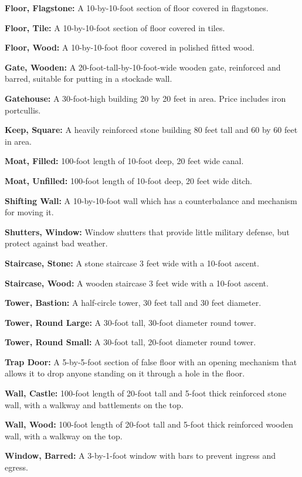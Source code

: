 \begin{multicols*}{2}
\textbf{Floor, Flagstone:} A 10-by-10-foot section of floor covered in flagstones.

\textbf{Floor, Tile:} A 10-by-10-foot section of floor covered in tiles.

\textbf{Floor, Wood:} A 10-by-10-foot floor covered in polished fitted wood.

\textbf{Gate, Wooden:} A 20-foot-tall-by-10-foot-wide wooden gate, reinforced and barred, suitable for putting in a stockade wall.

\textbf{Gatehouse:} A 30-foot-high building 20 by 20 feet in area. Price includes iron portcullis.

\textbf{Keep, Square:} A heavily reinforced stone building 80 feet tall and 60 by 60 feet in area.

\textbf{Moat, Filled:} 100-foot length of 10-foot deep, 20 feet wide canal.

\textbf{Moat, Unfilled:} 100-foot length of 10-foot deep, 20 feet wide ditch.

\textbf{Shifting Wall:} A 10-by-10-foot wall which has a counterbalance and mechanism for moving it.

\textbf{Shutters, Window:} Window shutters that provide little military defense, but protect against bad weather.

\textbf{Staircase, Stone:} A stone staircase 3 feet wide with a 10-foot ascent.

\textbf{Staircase, Wood:} A wooden staircase 3 feet wide with a 10-foot ascent.

\textbf{Tower, Bastion:} A half-circle tower, 30 feet tall and 30 feet diameter.

\textbf{Tower, Round Large:} A 30-foot tall, 30-foot diameter round tower.

\textbf{Tower, Round Small:} A 30-foot tall, 20-foot diameter round tower.

\textbf{Trap Door:} A 5-by-5-foot section of false floor with an opening mechanism that allows it to drop anyone standing on it through a hole in the floor.

\textbf{Wall, Castle:} 100-foot length of 20-foot tall and 5-foot thick reinforced stone wall, with a walkway and battlements on the top.

\textbf{Wall, Wood:} 100-foot length of 20-foot tall and 5-foot thick reinforced wooden wall, with a walkway on the top.

\textbf{Window, Barred:} A 3-by-1-foot window with bars to prevent ingress and egress.


\end{multicols*}
